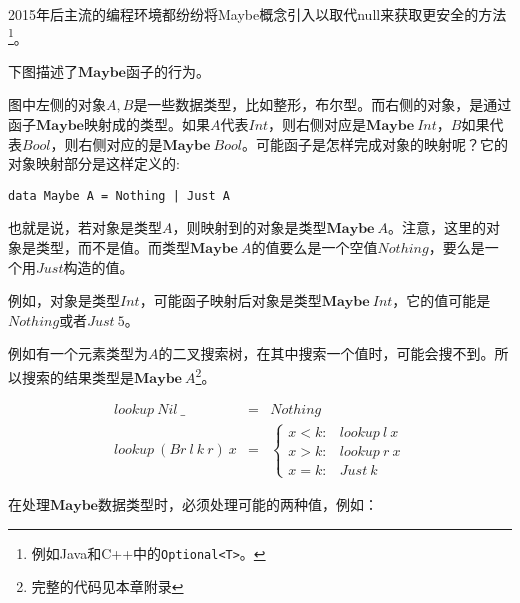 \documentclass{article}
\begin{document}
\begin{example}
2015年后主流的编程环境都纷纷将Maybe概念引入以取代null来获取更安全的方法\footnote{例如Java和C++中的\texttt{Optional<T>}。}。

下图描述了$\mathbf{Maybe}$函子的行为。

\begin{center}
\end{center}

图中左侧的对象$A, B$是一些数据类型，比如整形，布尔型。而右侧的对象，是通过函子$\mathbf{Maybe}$映射成的类型。如果$A$代表$Int$，则右侧对应是$\mathbf{Maybe}\ Int$，$B$如果代表$Bool$，则右侧对应的是$\mathbf{Maybe}\ Bool$。可能函子是怎样完成对象的映射呢？它的对象映射部分是这样定义的:

\lstset{frame=none}
\begin{lstlisting}
data Maybe A = Nothing | Just A
\end{lstlisting}

也就是说，若对象是类型$A$，则映射到的对象是类型$\mathbf{Maybe}\ A$。注意，这里的对象是类型，而不是值。而类型$\mathbf{Maybe}\ A$的值要么是一个空值$Nothing$，要么是一个用$Just$构造的值。

例如，对象是类型$Int$，可能函子映射后对象是类型$\mathbf{Maybe}\ Int$，它的值可能是$Nothing$或者$Just\ 5$。

例如有一个元素类型为$A$的二叉搜索树，在其中搜索一个值时，可能会搜不到。所以搜索的结果类型是$\mathbf{Maybe}\ A$\footnote{完整的代码见本章附录}。

\[
\begin{array}{rcl}
lookup\ Nil\ \_ & = & Nothing \\
lookup\ (Br\ l\ k\ r)\ x & = & \begin{cases}
  x < k: & lookup\ l\ x \\
  x > k: & lookup\ r\ x \\
  x = k: & Just\ k
\end{cases}
\end{array}
\]

在处理$\mathbf{Maybe}$数据类型时，必须处理可能的两种值，例如：


\end{example}
\end{document}
